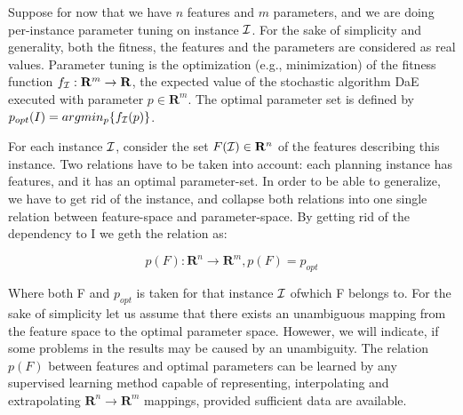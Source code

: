 \documentclass[letterpaper]{article}
\begin{document}
Suppose for now that we have $n$ features and $m$ parameters, and we are doing per-instance parameter tuning on instance $\cal I$. For the sake of simplicity and generality, both the fitness, the features and the parameters are considered as real values. Parameter tuning is the optimization (e.g., minimization) of the fitness function \begin{math}f_{\cal I}:\mathbf{R}^m\to \mathbf{R} \end{math}, the expected value of the stochastic algorithm DaE executed with parameter \begin{math} p \in \mathbf{R}^m \end{math}. The optimal parameter set is defined by \begin{math} p_{opt}(I)=argmin_p\{f_{\cal I}(p)\} \end{math}. 

For each instance $\cal I$, consider the set \begin{math} F({\cal I}) \in \mathbf{R}^n \end{math} of the features describing this instance. 
Two relations have to be taken into account: each planning instance has features, and it has an optimal parameter-set. In order to be able to generalize, we have to get rid of the instance, and collapse both relations into one single relation between feature-space and parameter-space. By getting rid of the dependency to \cal I we geth the relation as:

\begin{equation} p(F): \mathbf{R}^n \to \mathbf{R}^m, p(F)=p_{opt} \end{equation}	

Where both F and \begin{math}p_{opt}\end{math}  is taken for that instance $\cal I$ ofwhich F belongs to. For the sake of simplicity let us assume that there exists an unambiguous mapping from the feature space to the optimal parameter space. Howewer, we will indicate, if some problems in the results may be caused by an unambiguity. The relation \begin{math} p(F) \end{math} between features and optimal parameters can be learned by any supervised learning method capable of representing, interpolating and extrapolating  \begin{math}\mathbf{R}^n\to \mathbf{R}^m \end{math} mappings, provided sufficient data are available.
\end{document}
